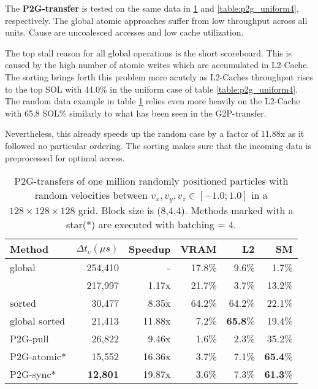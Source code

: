 \documentclass[m,times]{cgMA}
\begin{document}
The \textbf{P2G-transfer} is tested on the same data in \ref{table:p2g_random} and \ref{table:p2g_uniform4}, respectively. The global atomic approaches suffer from low throughput across all units. Cause are uncoalesced accesses and low cache utilization.

The top stall reason for all global operations is the short scoreboard. This is caused by the high number of atomic writes which are accumulated in L2-Cache. The sorting brings forth this problem more acutely as L2-Caches throughput rises to the top SOL with 44.0\% in the uniform case of table \ref{table:p2g_uniform4}. The random data example in table \ref{table:p2g_random} relies even more heavily on the L2-Cache with 65.8 SOL\% similarly to what has been seen in the G2P-transfer.

Nevertheless, this already speeds up the random case by a factor of 11.88x as it followed no particular ordering. The sorting makes sure that the incoming data is preprocessed for optimal access.

\begin{table}[htpb]
  \begin{tabular}{ | l | r | r | r | r | r |}    \hline
    Method                 &  $\Delta t_c(\mu s)$ &Speedup         &VRAM  & L2   &SM    \\\hline
    global                 &  254,410             &-               &17.8\%&9.6\% &1.7\%  \\\hline
    \cite{Meyer2015}       &  217,997             &1.17x           &21.7\%&3.7\% &13.2\% \\\hline
    \cite{Meyer2015} sorted&   30,477		  &8.35x           &64.2\%&64.2\%&22.1\% \\\hline
    global sorted          &   21,413		  &11.88x          &7.2\% &\textbf{65.8}\%&19.4\% \\\hline
    \hline
    P2G-pull               &   26,822             &9.46x           &1.6\% &2.3\% &35.2\%\\\hline
    P2G-atomic*		   &   15,552             &16.36x          &3.7\% &7.1\% &\textbf{65.4}\%\\\hline
    P2G-sync*              &   \textbf{12,801}    &19.87x          &3.6\% &7.3\% &\textbf{61.3}\%\\\hline
 \end{tabular}
 \caption{P2G-transfers of one million randomly positioned particles with random velocities between $v_x,v_y,v_z \in [-1.0;1.0]$ in a $128\times 128\times128$ grid. Block size is (8,4,4). Methods marked with a star(*) are executed with batching = 4.}\label{table:p2g_random}
\end{table}
\end{document}

